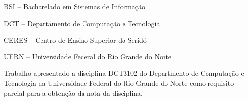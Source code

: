 
\instituicao
{
	BSI -- Bacharelado em Sistemas de Informação\par 
	DCT -- Departamento de Computação e Tecnologia\par
   CERES -- Centro de Ensino Superior do Seridó\par
   UFRN -- Universidade Federal do Rio Grande do Norte
}
	
\comentario
{
	Trabalho apresentado a disciplina DCT3102
do Departmento de Computação e Tecnologia da Universidade Federal do Rio Grande
do Norte como requisito parcial para a
obtenção da nota da disciplina.\bigskip\\
%  
}
		
	
\folhaderosto